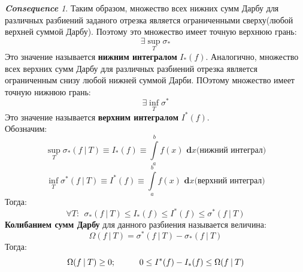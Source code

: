 \documentclass[a4paper,12pt, centered]{bookest}
\theoremstyle{remark}
\newtheorem*{cons*}{\textbf{Consequence}}
\newcommand\tab[1][1cm]{\hspace*{#1}}
\newcommand\dx{\textbf{ d}x}
\begin{document}
\begin{cons*}
	Таким образом, множество всех нижних сумм Дарбу для различных разбиений заданого отрезка является ограниченными сверху(любой верхней суммой Дарбу). Поэтому это множество имеет точную верхнюю грань:
	$$\exists\sup_T\sigma_*$$ Это значение называется \textbf{нижним интегралом }$I_*(f)$. Аналогично, множество всех верхних сумм Дарбу для различных разбиений отрезка является ограниченным снизу любой нижней суммой Дарби. ПОэтому множество имеет точную нижнюю грань: 
	$$\exists\inf_T\sigma^*$$ Это значение называется \textbf{верхним интегралом }$I^*(f)$. \\ Обозначим: 
	$$\sup_T\sigma_*(f\>|\>T)\equiv I_*(f)\equiv\int\limits_a^bf(x)\dx\textrm{(нижний интеграл)}$$ 
	$$\inf_T\sigma^*(f\>|\>T)\equiv I^*(f)\equiv\int\limits_a^bf(x)\dx\textrm{(верхний интеграл)}$$ 
	Тогда: $$\forall T:\>\>\sigma_*(f\>|\>T)\leq I_*(f)\leq I^*(f)\leq \sigma^*(f\>|\>T)$$
	\textbf{Колибанием сумм Дарбу} для данного разбиения называется величина: $$\Omega(f\>|\>T)=\sigma^*(f\>|\>T)-\sigma_*(f\>|\>T)$$
	Тогда: $$\Omega(f\>|\>T)\geq0;\tab0\leq I^*(f)-I_*(f)\leq\Omega(f\>|\>T)$$
\end{cons*} 
\end{document}
